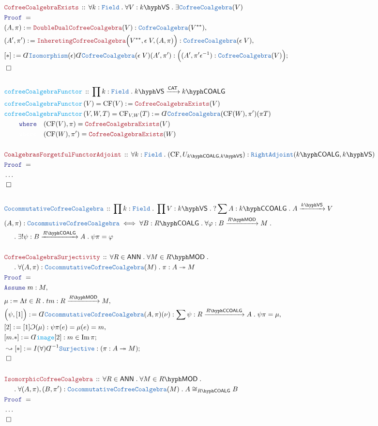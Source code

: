 \documentclass[12pt]{scrartcl}%
\newcommand{\TYPE}[1]{\textcolor{NavyBlue}{\mathtt{#1}}}%
\newcommand{\FUNC}[1]{\textcolor{Cerulean}{\mathtt{#1}}}%
\newcommand{\LOGIC}[1]{\textcolor{Blue}{\mathtt{#1}}}%
\newcommand{\THM}[1]{\textcolor{Maroon}{\mathtt{#1}}}%
\renewcommand{\.}{\; . \;} %
\newcommand{\de}{: \kern 0.1pc =} %
\newcommand{\where}{\LOGIC{where}} %
\newcommand{\Act}[1]{\left( #1 \right)} %
\newcommand{\Theorem}[2]{& \THM{#1} \, :: \, #2 \\ & \Proof = \\ } %
\newcommand{\DeclareType}[2]{& \TYPE{#1} \, :: \, #2 \\}%
\newcommand{\DefineType}[3]{& #1 : \TYPE{#2} \iff #3 \\}%
\newcommand{\DeclareFunc}[2]{& \FUNC{#1} \, :: \, #2 \\}%
\newcommand{\DefineNamedFunc}[4]{&  \FUNC{#1}\Act{#2} = #3 \de #4 \\}%
\newcommand{\NewLine}{\\ & \kern 1pc}%
\newcommand{\Page}[1]{ \begin{align*} #1 \end{align*}  }%
\newcommand{ \bd }{ \ByDef }%
\newcommand{\NoProof}{ & \ldots \\ \EndProof}%
\DeclareMathOperator*{\im}{Im}%
\newcommand{\ToSurj}{\twoheadrightarrow} %
\newcommand{\Say}[3]{& #1 \de #2 : #3, \\} %
\newcommand{\Conclude}[3]{& #1 \de #2 : #3; \\}%
\newcommand{\DeriveConclude}[3]{& \leadsto #1 \de #2 : #3 ; \\} %
\newcommand{\Assume}[2]{& \LOGIC{Assume} \; #1 : #2, \\} %
\newcommand{\QED}{\; \square} %
\newcommand{\EndProof}{& \QED \\} %
\newcommand{\ByDef}{\rotatebox[origin=c]{-180}{$D$}}%
\newcommand{\ByConstr}{\rotatebox[origin=c]{-180}{$C$}}%
\newcommand{\Proof}{\LOGIC{Proof} \; } %
\newcommand{\Arrow}[1]{\xrightarrow{#1}}%
\newcommand{\CAT}{\mathsf{CAT}} %
\newcommand{\VS}[1]{#1\hyph\mathsf{VS}} %
\newcommand{\LMOD}[1]{#1\hyph\mathsf{MOD}} %
\newcommand{\Field}{\TYPE{Field}}
\newcommand{\ANN}{\mathsf{ANN}} %
\newcommand{\COALG}[1]{#1\hyph\mathsf{COALG}}%
\newcommand{\CCOALG}[1]{#1\hyph\mathsf{CCOALG}}%
\begin{document}
\Page{
	\Theorem{CofreeCoalgebraExists}{\forall k : \Field \. \forall V : \VS{k} \. \exists \TYPE{CofreeCoalgebra}(V)}
	\Say{(A,\pi)}{\THM{DoubleDualCofreeCoalgebra}(V) }{\TYPE{CofreCoalgebra}(V^{**})}
	\Say{(A',\pi')}{\THM{InheretingCofreeCoalgebra}\Big(V^{**},\epsilon \; V,(A,\pi)\Big)}{\TYPE{CofreeCoalgebra}(\epsilon \; V)}
	\Conclude{[*]}{\bd \TYPE{Isomorphism}(\epsilon) \bd \TYPE{CofreeCoalgebra}(\epsilon \; V) (A',\pi')}
	{
		\Big( (A',\pi'\epsilon^{-1} ) : \TYPE{CofreeCoalgebra}(V) \Big)
	}
	\EndProof
	\\
	\DeclareFunc{cofreeCoalgebraFunctor}{\prod k : \Field \. \VS{k} \Arrow{\CAT} \COALG{k}}
	\DefineNamedFunc{cofreeCoalgebraFunctor}{V}{\mathrm{CF}(V)}{\THM{CofreeCoalgebraExists}(V)}
	\DefineNamedFunc{cofreeCoalgebraFunctor}{V,W,T}{\mathrm{CF}_{V,W}(T)}{ \bd \TYPE{CofreeCoalgebra}(\mathrm{CF}(W),\pi')(\pi T)  
		\NewLine
		\quad \where \quad (\mathrm{CF}(V),\pi) = \THM{CofreeCoalgebraExists}(V) 
		\NewLine
		\quad {\color{white} \mathtt{where}} \quad (\mathrm{CF}(W),\pi') = \THM{CofreeCoalgebraExists}(W)
	}
	\\
	\Theorem{CoalgebrasForgetfulFunctorAdjoint}
	{
		\forall k : \Field \. 
		(\mathrm{CF},U_{\COALG{k},\VS{k}}) : \TYPE{RightAdjoint}(\COALG{k},\VS{k})
	}
	\NoProof
	\\
	\DeclareType{CocommutativeCofreeCoalgebra}{\prod k : \Field \. \prod V : \VS{k} \. ?\sum A :\CCOALG{k} \. A  \Arrow{\VS{k}} V } 
	\DefineType{(A,\pi)}{CocommutiveCofreeCoalgebra}{\forall B : \COALG{R} \. \forall \varphi : B \Arrow{\LMOD{R}} M \. \NewLine \. \exists! \psi : B \Arrow{\COALG{R}} A \. \psi \pi = \varphi  }
	\\
	\Theorem{CofreeCoalgebraSurjectivity}
	{
		\forall R \in \ANN \.
		\forall M \in \LMOD{R} \. \NewLine \. 
		\forall (A,\pi) : \TYPE{CocommutativeCofreeCoalgebra}(M) \.
		\pi : A \ToSurj M
	}
	\Assume{m}{M}
	\Say{\mu}{\Lambda t \in R \. tm }{R \Arrow{\LMOD{R}} M}
	\Say{\Big( \psi,[1]\Big)}{\bd \TYPE{CocommutativeCofreeCoalgebra}(A,\pi)(\nu)}{\sum \psi : R \Arrow{\CCOALG{R}} A \. \psi \pi = \mu }
	\Say{[2]}{[1]\ByConstr(\mu)}{ \psi \pi(e) = \mu(e) = m}
	\Conclude{[m.*]}{\bd \FUNC{image}[2]}{ m \in \im \pi  }
	\DeriveConclude{[*]}{I(\forall)\bd^{-1}\TYPE{Surjective}}{( \pi : A \ToSurj M )}
	\EndProof
	\\
	\Theorem{IsomorphicCofreeCoalgebra}
	{
		\forall R \in \ANN \.
		\forall M \in \LMOD{R} \.\NewLine \. 
		\forall (A,\pi),(B,\pi') : \TYPE{CocommutativeCofreeCoalgebra}(M) \.
		A \cong_{\COALG{R}} B
	}
	\NoProof
}
\end{document}

